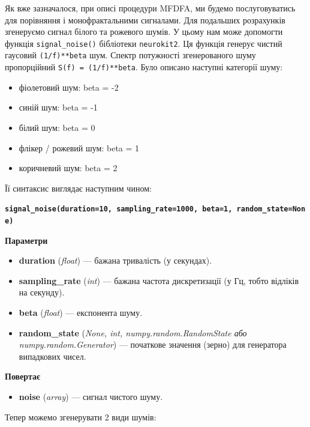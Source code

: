 \documentclass[
  letterpaper,
]{report}
\providecommand{\tightlist}{%
  \setlength{\itemsep}{0pt}\setlength{\parskip}{0pt}}\usepackage{longtable,booktabs,array}
\begin{document}
Як вже зазначалося, при описі процедури MFDFA, ми будемо послуговуватись
для порівняння і монофрактальними сигналами. Для подальших розрахунків
згенеруємо сигнал білого та рожевого шумів. У цьому нам може допомогти
функція \texttt{signal\_noise()} бібліотеки \texttt{neurokit2}. Ця
функція генерує чистий гаусовий \texttt{(1/f)**beta} шум. Спектр
потужності згенерованого шуму пропорційний
\texttt{S(f)\ =\ (1/f)**beta}. Було описано наступні категорії шуму:

\begin{itemize}
\tightlist
\item
  фіолетовий шум: beta = -2
\item
  синій шум: beta = -1
\item
  білий шум: beta = 0
\item
  флікер / рожевий шум: beta = 1
\item
  коричневий шум: beta = 2
\end{itemize}

Її синтаксис виглядає наступним чином:

\textbf{\texttt{signal\_noise(duration=10,\ sampling\_rate=1000,\ beta=1,\ random\_state=None)}}

\textbf{Параметри}

\begin{itemize}
\tightlist
\item
  \textbf{duration} (\emph{float}) --- бажана тривалість (у секундах).
\item
  \textbf{sampling\_rate} (\emph{int}) --- бажана частота дискретизації
  (у Гц, тобто відліків на секунду).
\item
  \textbf{beta} (\emph{float}) --- експонента шуму.
\item
  \textbf{random\_state} (\emph{None, int, numpy.random.RandomState або
  numpy.random.Generator}) --- початкове значення (зерно) для генератора
  випадкових чисел.
\end{itemize}

\textbf{Повертає}

\begin{itemize}
\tightlist
\item
  \textbf{noise} (\emph{array}) --- сигнал чистого шуму.
\end{itemize}

Тепер можемо згенерувати 2 види шумів:
\end{document}
